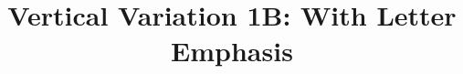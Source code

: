 \documentclass[11pt]{article}
\begin{document}
\title{Vertical Variation 1B: With Letter Emphasis}
\date{}
\maketitle

\end{document}
